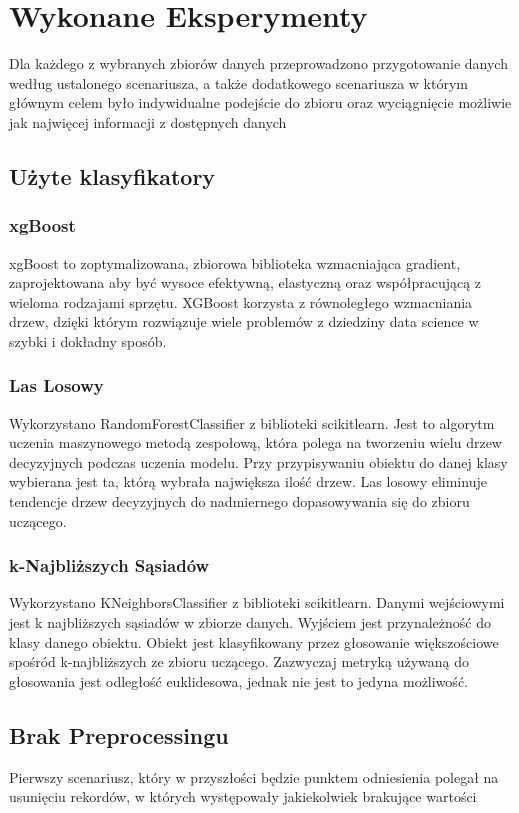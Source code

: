 \documentclass{book}
\begin{document}
\chapter{Wykonane Eksperymenty}
Dla każdego z wybranych zbiorów danych przeprowadzono 
przygotowanie danych według ustalonego scenariusza, 
a także dodatkowego scenariusza w którym głównym celem było 
indywidualne podejście do zbioru oraz wyciągnięcie możliwie 
jak najwięcej informacji z dostępnych danych
\section{Użyte klasyfikatory}
\subsection{xgBoost}
xgBoost to zoptymalizowana, zbiorowa biblioteka wzmacniająca gradient, zaprojektowana aby być wysoce
efektywną, elastyczną oraz współpracującą z wieloma rodzajami sprzętu. XGBoost korzysta z równoległego wzmacniania drzew, 
dzięki którym rozwiązuje wiele problemów z dziedziny data science w szybki i dokładny sposób. \cite{xgBoost}

\subsection{Las Losowy}
Wykorzystano RandomForestClassifier z biblioteki scikit\-learn. 
Jest to algorytm uczenia maszynowego metodą zespołową, 
która polega na tworzeniu wielu drzew decyzyjnych podczas 
uczenia modelu. Przy przypisywaniu obiektu do danej klasy wybierana
jest ta, którą wybrała największa ilość drzew. Las losowy eliminuje 
tendencje drzew decyzyjnych do nadmiernego dopasowywania się do zbioru
uczącego. \cite{random forest}

\subsection{k-Najbliższych Sąsiadów}
Wykorzystano KNeighborsClassifier z biblioteki 
scikit\-learn. Danymi wejściowymi jest k 
najbliższych sąsiadów w zbiorze danych. Wyjściem 
jest przynależność do klasy danego obiektu. Obiekt 
jest klasyfikowany przez głosowanie większościowe 
spośród k-najbliższych ze zbioru uczącego. Zazwyczaj 
metryką używaną do głosowania jest odległość euklidesowa, 
jednak nie jest to jedyna możliwość. \cite{k-nearest neighbors}

\section{Brak Preprocessingu}
Pierwszy scenariusz, który w przyszłości 
będzie punktem odniesienia polegał na usunięciu rekordów, 
w których występowały jakiekolwiek brakujące wartości
\end{document}
